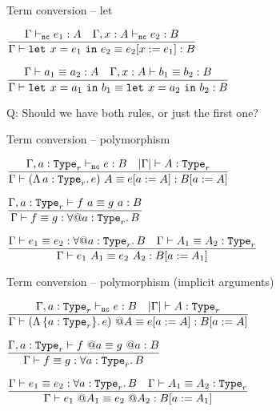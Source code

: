 \begin{frame}{Term conversion -- let}

\begin{center}
  $\infrule{\typing[\Gamma][\noncomputable]{e_1}{A} \quad \typing[\extend{\Gamma}{x}{A}][\noncomputable]{e_2}{B}}{\termconv{\letin{x}{e_1}{e_2}}{\subst{e_2}{x}{e_1}}{B}}$

  \vspace{2em}

  $\infrule{\termconv[\Gamma]{a_1}{a_2}{A} \quad \termconv[\extend{\Gamma}{x}{A}]{b_1}{b_2}{B}}{\termconv[\Gamma]{\letin{x}{a_1}{b_1}}{\letin{x}{a_2}{b_2}}{B}}$
\end{center}

\vspace{2em}

Q: Should we have both rules, or just the first one?

\end{frame}

\begin{frame}{Term conversion -- polymorphism}

\begin{center}
  $\infrule{\typing[\extendtype{\Gamma}{a}[r]][\noncomputable]{e}{B} \quad \type[\cartesianize{\Gamma}]{A}[r]}{\termconv{\tapp{(\tfun{a}[r]{e})}{A}}{\subst{e}{a}{A}}{\subst{B}{a}{A}}}$

  \vspace{2em}

  $\infrule{\termconv[\extendtype{\Gamma}{a}[r]]{\tapp{f}{a}}{\tapp{g}{a}}{B}}{\termconv[\Gamma]{f}{g}{\ForallE{a}[r]{B}}}$

  \vspace{2em}

  $\infrule{\termconv{e_1}{e_2}{\ForallE{a}[r]{B}} \quad \typeconv{A_1}{A_2}[r]}{\termconv{\tapp{e_1}{A_1}}{\tapp{e_2}{A_2}}{\subst{B}{a}{A_1}}}$
\end{center}

\end{frame}

\begin{frame}{Term conversion -- polymorphism (implicit arguments)}

\begin{center}
  $\infrule{\typing[\extendtype{\Gamma}{a}[r]][\noncomputable]{e}{B} \quad \type[\cartesianize{\Gamma}]{A}[r]}{\termconv{\itapp{(\itfun{a}[r]{e})}{A}}{\subst{e}{a}{A}}{\subst{B}{a}{A}}}$

  \vspace{2em}

  $\infrule{\termconv[\extendtype{\Gamma}{a}[r]]{\itapp{f}{a}}{\itapp{g}{a}}{B}}{\termconv[\Gamma]{f}{g}{\ForallI{a}[r]{B}}}$

  \vspace{2em}

  $\infrule{\termconv{e_1}{e_2}{\ForallI{a}[r]{B}} \quad \typeconv{A_1}{A_2}[r]}{\termconv{\itapp{e_1}{A_1}}{\itapp{e_2}{A_2}}{\subst{B}{a}{A_1}}}$
\end{center}

\end{frame}